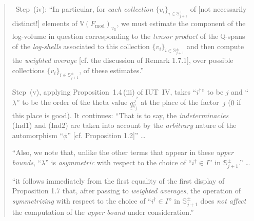 \documentclass[11pt,a4paper]{article}
\newcommand{\qq}{\underline{\underline{q}}{}}
\newcommand{\lab}[2]{{\upshape\fcolorbox{#1}{#1!8}{\scriptsize\sffamily\bfseries\textcolor{#1}{#2}}}}
\newcommand{\tagS}{\lab{blue}{S}}
\newcommand{\q}[1]{``#1''}
\newcommand{\srcquote}[2]{\begin{quote}\small\tagS\ #1\par\nopagebreak\hfill{\footnotesize #2}\end{quote}}
\theoremstyle{plain}
\theoremstyle{definition}
\theoremstyle{remark}
\begin{document}
\srcquote{Step~(iv): \q{In particular, for \emph{each collection} $\{v_i\}_{i\in\mathbb{S}^\pm_{j+1}}$ of
[not necessarily distinct!] elements of $\mathbb{V}(F_{\mathrm{mod}})_{v_{\mathbb{Q}}}$, we must estimate the
component of the log-volume in question corresponding to the \emph{tensor product} of the $\mathbb{Q}$-spans
of the \emph{log-shells} associated to this collection $\{v_i\}_{i\in\mathbb{S}^\pm_{j+1}}$ and then compute
the \emph{weighted average} [cf. the discussion of Remark 1.7.1], over possible collections
$\{v_i\}_{i\in\mathbb{S}^\pm_{j+1}}$, of these estimates.}\par
Step~(v), applying Proposition~1.4\,(iii) of IUT~IV, takes ``$i^\dagger$'' to be $j$ and ``$\lambda$'' to be the order of the theta value $\qq^{\,j^2}_{\underline{v}_j}$
at the place of the factor~$j$ ($0$ if this place is good). It continues: \q{That is to say, the
\emph{indeterminacies} (Ind1) and (Ind2) are taken into account by the \emph{arbitrary} nature of the
automorphism ``$\phi$'' [cf. Proposition 1.2]} \dots\par
\q{Also, we note that, unlike the other terms that appear in these \emph{upper bounds}, ``$\lambda$'' is
\emph{asymmetric} with respect to the choice of ``$i^\dagger\in I$'' in $\mathbb{S}^\pm_{j+1}$.} \dots\par
\q{it follows immediately from the first equality of the first display of Proposition 1.7 that, after passing
to \emph{weighted averages}, the operation of \emph{symmetrizing} with respect to the choice of
``$i^\dagger\in I$'' in $\mathbb{S}^\pm_{j+1}$ does \emph{not affect} the computation of the \emph{upper bound}
under consideration.}}{\cite[proof of Thm.~1.10, Steps~(iv), (v)]{IUT4}}
\end{document}
